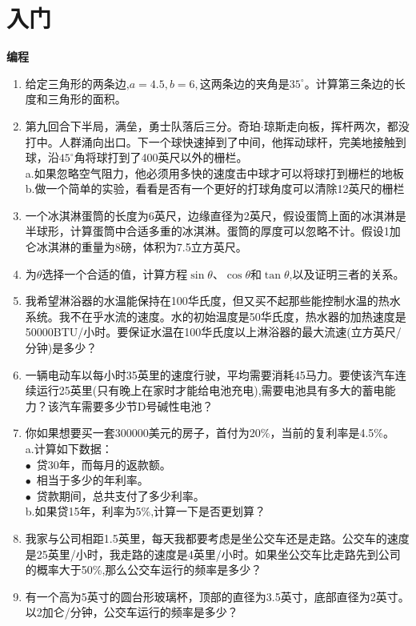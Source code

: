 \documentclass[UTF8]{ctexart}
\begin{document}
\section{入门}
\textbf{编程}\\
\begin{enumerate}
	\item 给定三角形的两条边,$a=4.5,b=6,这两条边的夹角是35^{\circ}。$计算第三条边的长度和三角形的面积。
	\item 第九回合下半局，满垒，勇士队落后三分。奇珀$\cdot$琼斯走向板，挥杆两次，都没打中。人群涌向出口。下一个球快速掉到了中间，他挥动球杆，完美地接触到球，沿$45^{\circ}$角将球打到了400英尺以外的栅栏。\\
	\qquad a.如果忽略空气阻力，他必须用多快的速度击中球才可以将球打到栅栏的地板
	\qquad b.做一个简单的实验，看看是否有一个更好的打球角度可以清除12英尺的栅栏
	\item 一个冰淇淋蛋筒的长度为6英尺，边缘直径为2英尺，假设蛋筒上面的冰淇淋是半球形，计算蛋筒中合适多重的冰淇淋。蛋筒的厚度可以忽略不计。假设1加仑冰淇淋的重量为8磅，体积为7.5立方英尺。
	\item 为$\theta$选择一个合适的值，计算方程$\sin\theta$、$\cos\theta$和$\tan\theta$,以及证明三者的关系。
	\item 我希望淋浴器的水温能保持在100华氏度，但又买不起那些能控制水温的热水系统。我不在乎水流的速度。水的初始温度是50华氏度，热水器的加热速度是50000BTU/小时。要保证水温在100华氏度以上淋浴器的最大流速(立方英尺/分钟)是多少？
	\item 一辆电动车以每小时35英里的速度行驶，平均需要消耗45马力。要使该汽车连续运行25英里(只有晚上在家时才能给电池充电),需要电池具有多大的蓄电能力？该汽车需要多少节D号碱性电池？
	\item 你如果想要买一套300000美元的房子，首付为20\%，当前的复利率是4.5\%。\\
	a.计算如下数据：\\
	$\bullet$ \,贷30年，而每月的返款额。\\
	$\bullet$ \,相当于多少的年利率。\\
	$\bullet$ \,贷款期间，总共支付了多少利率。\\
	b.如果贷15年，利率为5\%,计算一下是否更划算？
	\item 我家与公司相距1.5英里，每天我都要考虑是坐公交车还是走路。公交车的速度是25英里/小时，我走路的速度是4英里/小时。如果坐公交车比走路先到公司的概率大于50\%,那么公交车运行的频率是多少？
	\item 有一个高为5英寸的圆台形玻璃杯，顶部的直径为3.5英寸，底部直径为2英寸。以2加仑/分钟，公交车运行的频率是多少？

\end{enumerate}
\end{document}
